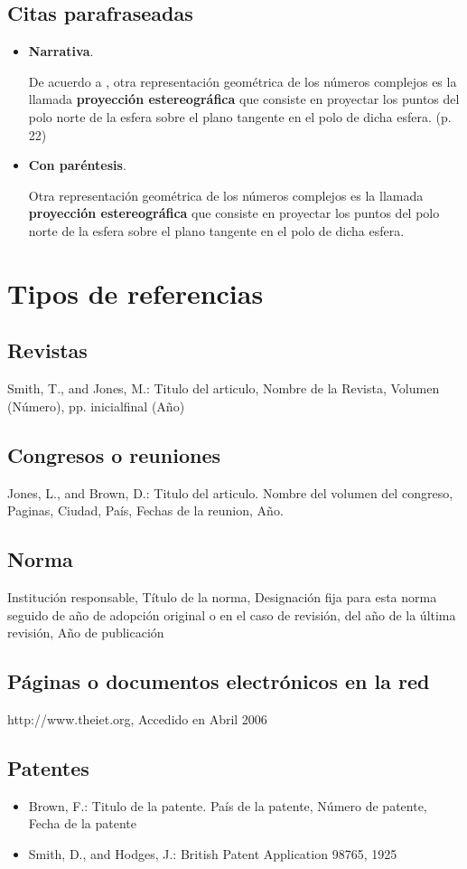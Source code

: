 \subsection{Citas parafraseadas}
\begin{itemize}
  \item \textbf{Narrativa}.
  
  De acuerdo a \cite{apostol1976analisis}, otra representación geométrica de los números complejos es la llamada \textbf{proyección estereográfica} que consiste en proyectar los puntos del polo norte de la esfera sobre el plano tangente en el polo de dicha esfera. (p. 22)
  \item \textbf{Con paréntesis}.
  
  Otra representación geométrica de los números complejos es la llamada \textbf{proyección estereográfica} que consiste en proyectar los puntos del polo norte de la esfera sobre el plano tangente en el polo de dicha esfera.\cite[p.22]{apostol1976analisis}
\end{itemize}
\section{Tipos de referencias}
\subsection{Revistas}
Smith, T., and Jones, M.: Titulo del articulo, Nombre de la Revista, Volumen (Número),  pp. inicialfinal (Año)
\subsection{Congresos o reuniones}
Jones, L., and Brown, D.: Titulo del articulo. Nombre del volumen del congreso, Paginas, Ciudad, País, Fechas de la reunion, Año.
\subsection{Norma}
Institución responsable, Título de la norma, Designación fija para esta norma seguido de año de adopción original o en el caso de revisión, del año de la última revisión, Año de publicación
\subsection{Páginas o documentos electrónicos en la red}
http://www.theiet.org, Accedido en Abril 2006
\subsection{Patentes}
\begin{itemize}
  \item Brown, F.: Titulo de la patente. País de la patente, Número de patente, Fecha de la patente
  \item Smith, D., and Hodges, J.: British Patent Application 98765, 1925
\end{itemize}
